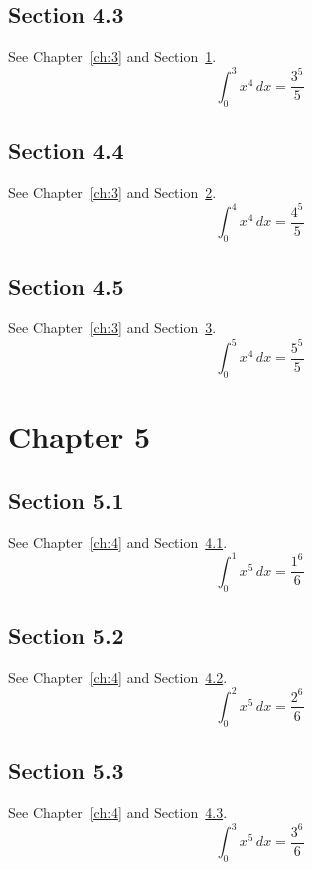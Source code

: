 \documentclass{book}
\begin{document}
\section{Section 4.3}\label{sec:4-3}
See Chapter~\ref{ch:3} and Section~\ref{sec:4-3}.
\lipsum[24-26]
\begin{equation}\label{eq:4-3} \int_0^{3} x^{4}\,dx = \frac{3^{5}}{5}\end{equation}
\section{Section 4.4}\label{sec:4-4}
See Chapter~\ref{ch:3} and Section~\ref{sec:4-4}.
\lipsum[25-27]
\begin{equation}\label{eq:4-4} \int_0^{4} x^{4}\,dx = \frac{4^{5}}{5}\end{equation}
\section{Section 4.5}\label{sec:4-5}
See Chapter~\ref{ch:3} and Section~\ref{sec:4-5}.
\lipsum[26-28]
\begin{equation}\label{eq:4-5} \int_0^{5} x^{4}\,dx = \frac{5^{5}}{5}\end{equation}
\chapter{Chapter 5}\label{ch:5}
\section{Section 5.1}\label{sec:5-1}
See Chapter~\ref{ch:4} and Section~\ref{sec:5-1}.
\lipsum[27-29]
\begin{equation}\label{eq:5-1} \int_0^{1} x^{5}\,dx = \frac{1^{6}}{6}\end{equation}
\section{Section 5.2}\label{sec:5-2}
See Chapter~\ref{ch:4} and Section~\ref{sec:5-2}.
\lipsum[28-30]
\begin{equation}\label{eq:5-2} \int_0^{2} x^{5}\,dx = \frac{2^{6}}{6}\end{equation}
\section{Section 5.3}\label{sec:5-3}
See Chapter~\ref{ch:4} and Section~\ref{sec:5-3}.
\lipsum[29-31]
\begin{equation}\label{eq:5-3} \int_0^{3} x^{5}\,dx = \frac{3^{6}}{6}\end{equation}
\end{document}
